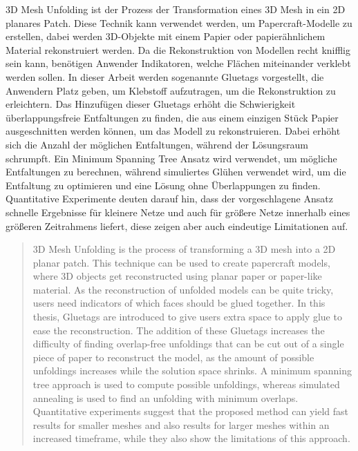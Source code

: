 \documentclass[draft,final]{vutinfth} %
\begin{document}
\begin{kurzfassung}
3D Mesh Unfolding ist der Prozess der Transformation eines 3D Mesh in ein 2D planares Patch. Diese Technik kann verwendet werden, um Papercraft-Modelle zu erstellen, dabei werden 3D-Objekte mit einem Papier oder papierähnlichem Material rekonstruiert werden. Da die Rekonstruktion von Modellen recht knifflig sein kann, benötigen Anwender Indikatoren, welche Flächen miteinander verklebt werden sollen. In dieser Arbeit werden sogenannte Gluetags vorgestellt, die Anwendern Platz geben, um Klebstoff aufzutragen, um die Rekonstruktion zu erleichtern. Das Hinzufügen dieser Gluetags erhöht die Schwierigkeit überlappungsfreie Entfaltungen zu finden, die aus einem einzigen Stück Papier ausgeschnitten werden können, um das Modell zu rekonstruieren. Dabei erhöht sich die Anzahl der möglichen Entfaltungen, während der Lösungsraum schrumpft. Ein Minimum Spanning Tree Ansatz wird verwendet, um mögliche Entfaltungen zu berechnen, während simuliertes Glühen verwendet wird, um die Entfaltung zu optimieren und eine Lösung ohne Überlappungen zu finden. Quantitative Experimente deuten darauf hin, dass der vorgeschlagene Ansatz schnelle Ergebnisse für kleinere Netze und auch für größere Netze innerhalb eines größeren Zeitrahmens liefert, diese zeigen aber auch eindeutige Limitationen auf.
\end{kurzfassung}

\begin{abstract}
3D Mesh Unfolding is the process of transforming a 3D mesh into a 2D planar patch. This technique can be used to create papercraft models, where 3D objects get reconstructed using planar paper or paper-like material. As the reconstruction of unfolded models can be quite tricky, users need indicators of which faces should be glued together. In this thesis, Gluetags are introduced to give users extra space to apply glue to ease the reconstruction. The addition of these Gluetags increases the difficulty of finding overlap-free unfoldings that can be cut out of a single piece of paper to reconstruct the model, as the amount of possible unfoldings increases while the solution space shrinks. A minimum spanning tree approach is used to compute possible unfoldings, whereas simulated annealing is used to find an unfolding with minimum overlaps. Quantitative experiments suggest that the proposed method can yield fast results for smaller meshes and also results for larger meshes within an increased timeframe, while they also show the limitations of this approach.
\end{abstract}
\end{document}

